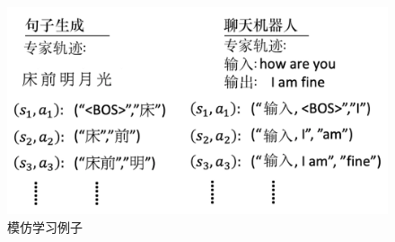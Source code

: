 \begin{figure}[htb]
   \centering
   \includegraphics[width=0.5\linewidth]{res/ch11/11.15}
   \caption{模仿学习例子}
   \label{fig:fig11.15}
\end{figure}







